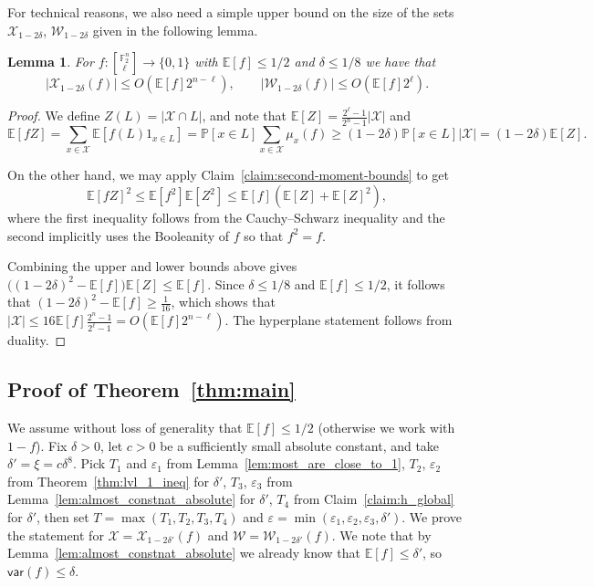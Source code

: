 \documentclass[11pt]{article}
\newtheorem{lemma}[thm]{Lemma}
\newcommand\E{\mathbb{E}}
\newcommand\card[1]{\left| {#1} \right|}
\newcommand\eps{\varepsilon}
\renewcommand\geq{\geqslant}
\renewcommand\leq{\leqslant}
\providecommand{\sqbinom}[2]{\genfrac{[}{]}{0pt}{}{#1}{#2}}
\begin{document}
For technical reasons, we also need a simple upper bound on the size of the sets $\mathcal{X}_{1-2\delta}$, 
$\mathcal{W}_{1-2\delta}$ given in the following lemma.
\begin{lemma}\label{lem:trivial_upper_bound_on_sizes}
    For $f\colon {\sqbinom{\mathbb{F}_2^n}{\ell}}\to\{0,1\}$ with $\E[f]\leq 1/2$ and $\delta\leq 1/8$ we have that 
    \[
    \card{\mathcal{X}_{1-2\delta}(f)}\leq O(\E[f] 2^{n-\ell}),
    \qquad 
    \card{\mathcal{W}_{1-2\delta}(f)}\leq O(\E[f] 2^{\ell}).
    \]
\end{lemma}
\begin{proof}
We define $Z(L)=|\mathcal{X}\cap L|$, and note that
$\E[Z] = \frac{2^\ell-1}{2^n-1} |\mathcal X|$ and
\[ \E[fZ] =\sum_{x\in\mathcal{X}}\E[f(L)1_{x\in L}] =\mathbb{P}[x\in L]\sum_{x\in\mathcal{X}}\mu_x(f)\geq (1-2\delta)\mathbb{P}[x\in L]|\mathcal{X}| =(1-2\delta) \E[Z]. \]

On the other hand, we may apply Claim~\ref{claim:second-moment-bounds} to get
\[\E[fZ]^2 \leq  \E[f^2]\E[Z^2]\leq \E[f] (\E[Z]+\E[Z]^2),\]
where the first inequality follows from the Cauchy--Schwarz inequality and the second implicitly uses the Booleanity of $f$ so that $f^2 = f$. 

Combining the upper and lower bounds above gives $\bigl((1-2\delta)^2-\E[f]\bigr)\E[Z]\le \E[f]$. Since $\delta\le 1/8$ and $\E[f]\le 1/2$, it follows that $(1-2\delta)^2-\E[f]\ge\tfrac1{16}$, which shows that $|\mathcal{X}|\le 16\E[f]\frac{2^n-1}{2^\ell-1} = O(\E[f] 2^{n-\ell})$. The hyperplane statement follows from duality.
\end{proof}

\subsection{Proof of Theorem~\ref{thm:main}}
We assume without loss of generality that $\E[f]\leq 1/2$ (otherwise we work with $1-f$).
Fix $\delta>0$, let $c>0$ be a sufficiently small absolute constant, and take $\delta' = \xi = c \delta^{8}$. Pick $T_1$ and $\eps_1$ from Lemma~\ref{lem:most_are_close_to_1}, $T_2$, $\eps_2$ from Theorem~\ref{thm:lvl_1_ineq} for $\delta'$, $T_3$, $\eps_3$ from Lemma~\ref{lem:almost_constnat_absolute} for $\delta'$, $T_4$ from Claim~\ref{claim:h_global} for $\delta'$, then set $T = \max(T_1,T_2,T_3,T_4)$ and $\eps = \min(\eps_1,\eps_2,\eps_3,\delta')$.
We prove the statement for 
$\mathcal{X} = \mathcal{X}_{1-2\delta'}(f)$ 
and $\mathcal{W} = \mathcal{W}_{1-2\delta'}(f)$. We note that by Lemma~\ref{lem:almost_constnat_absolute} we already know that $\E[f]\leq \delta'$, so 
$\mathsf{var}(f)\leq \delta$.
\end{document}
